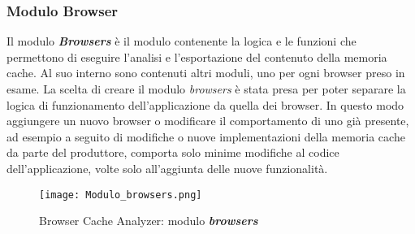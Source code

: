\subsubsection{Modulo Browser}
Il modulo \textbf{\textit{Browsers}} è il modulo contenente la logica e le funzioni che permettono di eseguire l'analisi e l'esportazione del contenuto della memoria cache. 
Al suo interno sono contenuti altri moduli, uno per ogni browser preso in esame. 
La scelta di creare il modulo \textit{browsers} è stata presa per poter separare la logica di funzionamento dell'applicazione da quella dei browser. In questo modo aggiungere un nuovo browser o modificare il comportamento di uno già presente, ad esempio a seguito di modifiche o nuove implementazioni della memoria cache da parte del produttore, comporta solo minime modifiche al codice dell'applicazione, volte solo all'aggiunta delle nuove funzionalità.

\begin{figure}[htpb]
	\begin{center}
		\texttt{[image: Modulo\_browsers.png]}
	\end{center}
	\caption[Browser Cache Analyzer: modulo \textbf{\textit{browsers}}]{Browser Cache Analyzer: modulo \textbf{\textit{browsers}}}
\end{figure}


